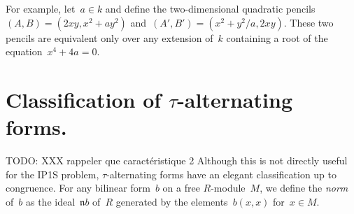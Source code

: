 \documentclass{lms}
\def\todo#1{{\color{orange}TODO: #1}}
\let\fr\mathfrak
\def\mat#1{\begin{pmatrix}#1\end{pmatrix}}
\DeclareMathOperator\Tr{Tr}
\begin{document}
For example, let~$a ∈ k$ and define the two-dimensional
quadratic pencils~$(A,B) = (2 x y, x^2 + a y^2)$
and~$(A', B') = (x^2 + y^2/a, 2 x y)$.
These two pencils are equivalent only over any extension of~$k$
containing a root of the equation~$x^4 + 4 a = 0$.
% 
% 


\section{Classification of $τ$-alternating forms.}

\todo{XXX rappeler que caractéristique 2}
Although this is not directly useful for the IP1S problem,
$τ$-alternating forms have an elegant classification up to congruence.
For any bilinear form~$b$ on a free $R$-module~$M$, we define the
\emph{norm} of~$b$ as the ideal~$\fr{n} b$ of~$R$
generated by the elements~$b(x, x)$ for~$x ∈ M$.
\end{document}
